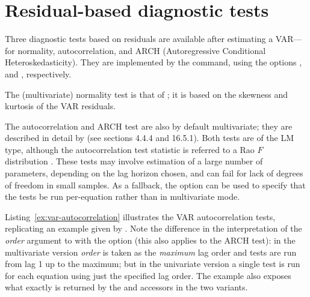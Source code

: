 \section{Residual-based diagnostic tests}

Three diagnostic tests based on residuals are available after estimating
a VAR---for normality, autocorrelation, and ARCH (Autoregressive
Conditional Heteroskedasticity). They are implemented by the
 command, using the options ,
 and , respectively.

The (multivariate) normality test is that of \cite{doornik-hansen94};
it is based on the skewness and kurtosis of the VAR residuals.

The autocorrelation and ARCH test are also by default multivariate; they
are described in detail by \cite{Lutkepohl05} (see sections 4.4.4 and
16.5.1). Both tests are of the LM type, although the autocorrelation
test statistic is referred to a Rao $F$ distribution
\citep{Rao73}. These tests may involve estimation of a large number of
parameters, depending on the lag horizon chosen, and can fail for lack
of degrees of freedom in small samples. As a fallback, the
 option can be used to specify that the tests be run
per-equation rather than in multivariate mode.

Listing~\ref{ex:var-autocorrelation} illustrates the VAR autocorrelation
tests, replicating an example given by \citet[p.\ 174]{Lutkepohl05}.
Note the difference in the interpretation of the \textsl{order} argument
to  with the  option (this also applies to
the ARCH test): in the multivariate version \textsl{order} is taken as
the \textit{maximum} lag order and tests are run from lag 1 up to the
maximum; but in the univariate version a single test is run for each
equation using just the specified lag order. The example also exposes
what exactly is returned by the  and 
accessors in the two variants.

